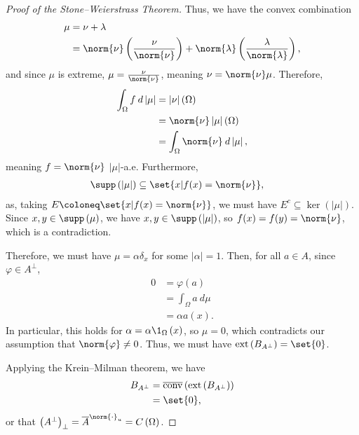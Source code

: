 \documentclass[10pt]{mypackage}
\begin{document}
\begin{proof}[Proof of the Stone--Weierstrass Theorem]
  Thus, we have the convex combination
  \begin{align*}
    \mu &= \nu + \lambda\\
        &= \norm{\nu}\left( \frac{\nu}{\norm{\nu}} \right) + \norm{\lambda}\left( \frac{\lambda}{\norm{\lambda}} \right),
  \end{align*}
  and since $\mu$ is extreme, $\mu = \frac{\nu}{\norm{\nu}}$, meaning $\nu = \norm{\nu}\mu$. Therefore,
  \begin{align*}
    \int_{\Omega}^{} f\:d\left\vert \mu \right\vert &= \left\vert \nu \right\vert\left( \Omega \right)\\
                                                    &= \norm{\nu}\left\vert \mu \right\vert\left( \Omega \right)\\
                                                    &= \int_{\Omega}^{} \norm{\nu}\:d\left\vert \mu \right\vert,
  \end{align*}
  meaning $f = \norm{\nu}$ $\left\vert \mu \right\vert$-a.e. Furthermore,
  \begin{align*}
    \supp\left( \left\vert \mu \right\vert \right) &\subseteq \set{x | f(x) = \norm{\nu}},
  \end{align*}
  as, taking $E \coloneq \set{x | f(x) = \norm{\nu}}$, we must have $E^{c} \subseteq \ker\left( \left\vert \mu \right\vert \right)$. Since $x,y\in \supp\left( \mu \right)$, we have $x,y\in \supp\left( \left\vert \mu \right\vert \right)$, so $f(x) = f(y) = \norm{\nu}$, which is a contradiction.\newline

  Therefore, we must have $\mu = \alpha \delta_x$ for some $\left\vert \alpha \right\vert = 1$. Then, for all $a\in A$, since $\varphi\in A^{\perp}$,
  \begin{align*}
    0 &= \varphi\left( a \right)\\
      &= \int_{\Omega}^{} a\:d\mu\\
      &= \alpha a(x).
  \end{align*}
  In particular, this holds for $\alpha = \alpha \1_{\Omega}\left( x \right)$, so $\mu = 0$, which contradicts our assumption that $\norm{\varphi}\neq 0$. Thus, we must have $\operatorname{ext}\left( B_{A^{\perp}} \right) = \set{0}$.\newline

  Applying the Krein--Milman theorem, we have
  \begin{align*}
    B_{A^{\perp}} &= \overline{\operatorname{conv}}\left( \operatorname{ext}\left( B_{A^{\perp}} \right) \right)\\
                  &= \set{0},
  \end{align*}
  or that $\left( A^{\perp} \right)_{\perp} = \overline{A}^{\norm{\cdot}_{u}} = C\left( \Omega \right)$.
\end{proof}
\end{document}
